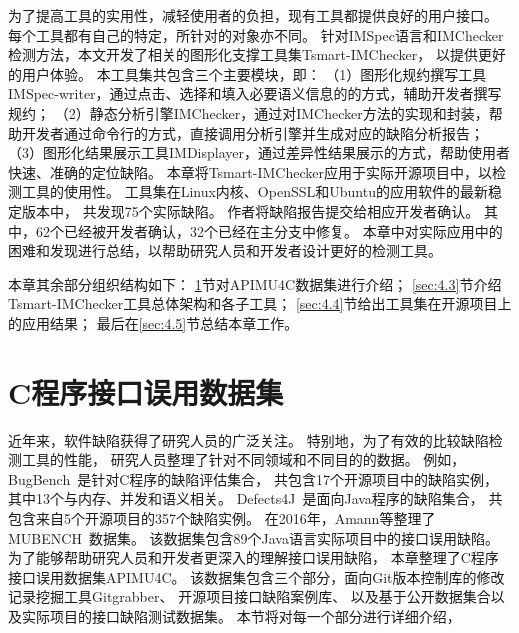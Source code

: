 为了提高工具的实用性，减轻使用者的负担，现有工具都提供良好的用户接口。
每个工具都有自己的特定，所针对的对象亦不同。
针对IMSpec语言和IMChecker检测方法，本文开发了相关的图形化支撑工具集Tsmart-IMChecker，
以提供更好的用户体验。
本工具集共包含三个主要模块，即：
（1）图形化规约撰写工具IMSpec-writer，通过点击、选择和填入必要语义信息的的方式，辅助开发者撰写规约；
（2）静态分析引擎IMChecker，通过对IMChecker方法的实现和封装，帮助开发者通过命令行的方式，直接调用分析引擎并生成对应的缺陷分析报告；
（3）图形化结果展示工具IMDisplayer，通过差异性结果展示的方式，帮助使用者快速、准确的定位缺陷。
本章将Tsmart-IMChecker应用于实际开源项目中，以检测工具的使用性。
工具集在Linux内核、OpenSSL和Ubuntu的应用软件的最新稳定版本中，
共发现75个实际缺陷。
作者将缺陷报告提交给相应开发者确认。
其中，62个已经被开发者确认，32个已经在主分支中修复。
本章中对实际应用中的困难和发现进行总结，以帮助研究人员和开发者设计更好的检测工具。



本章其余部分组织结构如下：
\ref{sec:4.2}节对APIMU4C数据集进行介绍；
\ref{sec:4.3}节介绍Tsmart-IMChecker工具总体架构和各子工具；
\ref{sec:4.4}节给出工具集在开源项目上的应用结果；
最后在\ref{sec:4.5}节总结本章工作。

\section{C程序接口误用数据集}
\label{sec:4.2}
近年来，软件缺陷获得了研究人员的广泛关注。
特别地，为了有效的比较缺陷检测工具的性能，
研究人员整理了针对不同领域和不同目的的数据。
例如，BugBench~\cite{05-bugbench}是针对C程序的缺陷评估集合，
共包含17个开源项目中的缺陷实例，
其中13个与内存、并发和语义相关。
Defects4J~\cite{14-issta-defects4j}是面向Java程序的缺陷集合，
共包含来自5个开源项目的357个缺陷实例。
在2016年，Amann等整理了MUBENCH~\cite{16-msr-mubench}数据集。
该数据集包含89个Java语言实际项目中的接口误用缺陷。
为了能够帮助研究人员和开发者更深入的理解接口误用缺陷，
本章整理了C程序接口误用数据集APIMU4C。
该数据集包含三个部分，面向Git版本控制库的修改记录挖掘工具Gitgrabber、
开源项目接口缺陷案例库、
以及基于公开数据集合以及实际项目的接口缺陷测试数据集。
本节将对每一个部分进行详细介绍，


